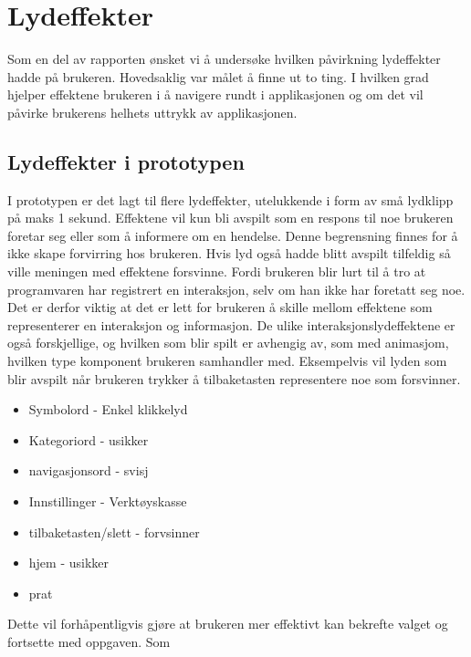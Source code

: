 \section{Lydeffekter}

Som en del av rapporten ønsket vi å undersøke hvilken påvirkning lydeffekter hadde på brukeren. Hovedsaklig var målet å finne ut to ting. I hvilken grad hjelper effektene brukeren i å navigere rundt i applikasjonen og om det vil påvirke brukerens helhets uttrykk av applikasjonen. 

\subsection{Lydeffekter i prototypen}

I prototypen er det lagt til flere lydeffekter, utelukkende i form av små lydklipp på maks 1 sekund. Effektene vil kun bli avspilt som en respons til noe brukeren foretar seg eller som å informere om en hendelse. Denne begrensning finnes for å ikke skape forvirring hos brukeren. Hvis lyd også hadde blitt avspilt tilfeldig så ville meningen med effektene forsvinne. Fordi brukeren blir lurt til å tro at programvaren har registrert en interaksjon, selv om han ikke har foretatt seg noe. Det er derfor viktig at det er lett for brukeren å skille mellom effektene som representerer en interaksjon og informasjon. De ulike interaksjonslydeffektene er også forskjellige, og hvilken som blir spilt er avhengig av,  som med animasjom,  hvilken type komponent brukeren samhandler med. Eksempelvis vil lyden som blir avspilt når brukeren trykker å tilbaketasten representere noe som forsvinner. 


\begin{itemize}
\item Symbolord - Enkel klikkelyd
\item Kategoriord - usikker
\item navigasjonsord - svisj
\item Innstillinger - Verktøyskasse
\item tilbaketasten/slett - forvsinner
\item hjem - usikker
\item prat
\end{itemize}








Dette vil forhåpentligvis gjøre at brukeren mer effektivt kan bekrefte valget og fortsette med oppgaven. Som 




